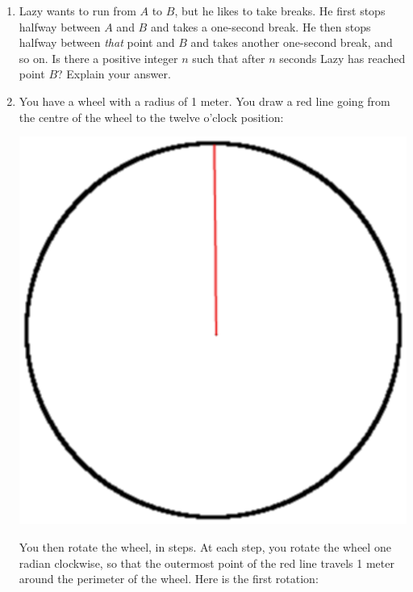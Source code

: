 \documentclass[12pt,a4paper]{article}
\begin{document}
\begin{enumerate}

\item Lazy wants to run from $A$ to $B$, but he likes to take breaks. He first stops halfway between $A$ and $B$ and takes a one-second break. He then stops halfway between \emph{that} point and $B$ and takes another one-second break, and so on. Is there a positive integer $n$ such that after $n$ seconds Lazy has reached point $B$? Explain your answer.
	
\item You have a wheel with a radius of 1 meter. You draw a red line going from the centre of the wheel to the twelve o'clock position:
	
\begin{center}
\includegraphics[scale=.2]{base}
\end{center}
	
	 You then rotate the wheel, in steps. At each step, you rotate the wheel one radian clockwise, so that the outermost point of the red line travels 1 meter around the perimeter of the wheel. Here is the first rotation:
	

\end{enumerate}
\end{document}
